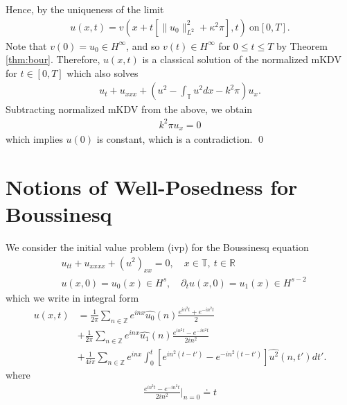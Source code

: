 \documentclass[12pt,reqno]{amsart}
\numberwithin{equation}{section}  %
\newcommand{\rr}{\mathbb{R}}
\newcommand{\zz}{\mathbb{Z}}
\newcommand{\ci}{\mathbb{T}}
\newcommand{\wh}{\widehat}
\newcommand{\p}{\partial}
\begin{document}
%
%
Hence, by the uniqueness of the limit
%
%
\begin{equation*}
\begin{split}
  u(x,t) = v(x + t [\|u_{0}  \|_{L^{2}}^{2} + \kappa^{2} \pi],t) \ \text{on} \left[
  0,T \right].
\end{split}
\end{equation*}
%
%
Note that $v(0) = u_{0} \in H^{\infty}$, and so $v(t) \in H^{\infty}$ for
$0 \le t \le T$ by Theorem \ref{thm:bour}. Therefore, $u(x,t)$ is a classical solution of the normalized mKDV for $t \in
[0,T]$ which also solves
%
%
\begin{equation*}
\begin{split}
  u_{t} + u_{xxx} + \left( u^{2} - \int_{\ci} u^{2} dx  - k^{2} \pi
  \right)u_{x}.
\end{split}
\end{equation*}
%
%
Subtracting normalized mKDV from the above, we obtain
%
%
\begin{equation*}
\begin{split}
  k^{2} \pi u_{x} = 0
\end{split}
\end{equation*}
%
%
which implies $u(0)$ is constant, which is a contradiction. \qed
 \section{Notions of Well-Posedness for Boussinesq}
        We consider the initial value problem (ivp) for the 
        Boussinesq equation 
\begin{align}
  & u_{tt} + u_{xxxx} + (u^2)_{xx} = 0, \quad x \in \ci, \ t \in \rr
  \label{eqn:mb-2}
  \\
  & u(x,0) = u_{0}(x) \in H^{s}, \quad \p_t u(x, 0) = u_1(x) \in H^{s-2}
  \label{eqn:mb-init-data-2}
  \end{align}
%
%
which we write in integral form
%
%
%
\begin{equation}
  \begin{split}
    u(x,t)
    & = \frac{1}{2\pi}\sum_{n \in \zz} e^{inx} \wh{u_{0}}(n) \frac{e^{in^{2}t} + e^{-in^{2}t}}{2} 
    \\
    & + \frac{1}{2 \pi}\sum_{n \in \zz} e^{inx}
    \wh{u_{1}}(n)\frac{e^{in^{2}t} - e^{-in^{2}t}}{2 i n^{2}} 
    \\
    & + \frac{1}{4 i \pi}\sum_{n \in \zz} e^{inx}
    \int_{0}^{t}[e^{in^{2}(t-t')}-e^{-in^{2}(t-t')}]
    \wh{u^{2}}(n, t') dt'.
  \end{split}
  \label{eqn:integral-form}
\end{equation}
%
where
%
%
\begin{equation*}
\begin{split}
  \frac{e^{in^{2}t} - e^{-in^{2}t}}{2 i n^{2}} \vert_{n=0} \doteq t 
\end{split}
\end{equation*}
%
%
\end{document}
